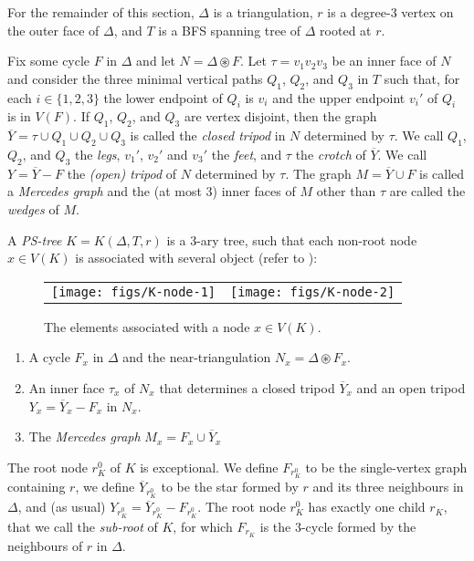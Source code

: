 \documentclass{patmorin}
\begin{document}
For the remainder of this section, $\Delta$ is a triangulation, $r$ is a degree-3 vertex on the outer face of $\Delta$, and $T$ is a BFS spanning tree of $\Delta$ rooted at $r$.

Fix some cycle $F$ in $\Delta$ and let $N=\Delta\circledast F$.
Let $\tau=v_1v_2v_3$ be an inner face of $N$ and consider the three minimal vertical paths $Q_1$, $Q_2$, and $Q_3$ in $T$ such that, for each $i\in\{1,2,3\}$ the lower endpoint of $Q_i$ is $v_i$ and the upper endpoint $v_i'$ of $Q_i$ is in $V(F)$.  If $Q_1$, $Q_2$, and $Q_3$ are vertex disjoint, then the graph $\overline{Y}=\tau\cup Q_1\cup Q_2\cup Q_3$ is called the \emph{closed tripod} in $N$ determined by $\tau$.  We call $Q_1$, $Q_2$, and $Q_3$ the \emph{legs}, $v_1'$, $v_2'$ and $v_3'$ the \emph{feet}, and $\tau$ the \emph{crotch} of $\overline{Y}$.  We call $Y=\overline{Y}-F$ the \emph{(open) tripod} of $N$ determined by $\tau$.  The graph $M=\overline{Y}\cup F$ is called a \emph{Mercedes graph} and the (at most 3) inner faces of $M$ other than $\tau$ are called the \emph{wedges} of $M$.

A \emph{PS-tree}  $K=K(\Delta, T, r)$ is a 3-ary tree, such that each non-root node $x\in V(K)$ is associated with several object (refer to ):

\begin{figure}
  \begin{center}
    \begin{tabular}{cc}
      \texttt{[image: figs/K-node-1]} &
      \texttt{[image: figs/K-node-2]}
    \end{tabular}
  \end{center}
  \caption{The elements associated with a node $x\in V(K)$.}
\end{figure}

\begin{enumerate}
  \item A cycle $F_x$ in $\Delta$ and the near-triangulation $N_x=\Delta\circledast F_x$.
  
  \item An inner face $\tau_x$ of $N_x$ that determines a closed tripod $\overline{Y}_x$ and an open tripod $Y_x=\overline{Y}_x-F_x$ in $N_x$.
  
  \item The \emph{Mercedes graph} $M_x=F_x\cup \overline{Y}_x$
\end{enumerate}

The root node $r^0_K$ of $K$ is exceptional.  We define $F_{r^0_K}$ to be the single-vertex graph containing $r$, we define $\overline{Y}_{r^0_K}$ to be the star formed by $r$ and its three neighbours in $\Delta$, and (as usual) $Y_{r^0_K}=\overline{Y}_{r^0_K}-F_{r^0_K}$.  The root node $r^0_K$ has exactly one child $r_K$, that we call the \emph{sub-root} of $K$, for which $F_{r_K}$ is the 3-cycle formed by the neighbours of $r$ in $\Delta$.
\end{document}
